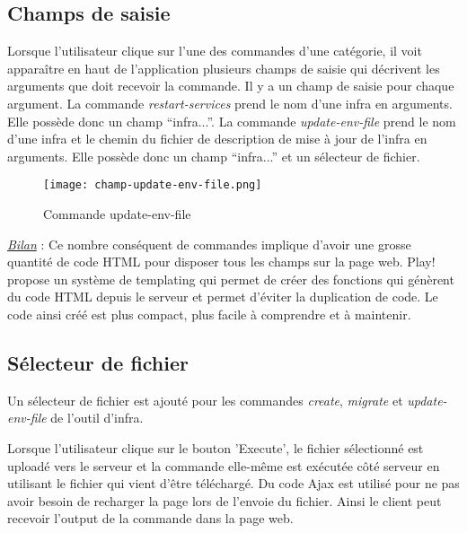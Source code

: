 \subsection{Champs de saisie}


Lorsque l'utilisateur clique sur l'une des commandes d'une catégorie, il voit
apparaître en haut de l'application plusieurs champs de saisie qui décrivent les
arguments que doit recevoir la commande.
Il y a un champ de saisie pour chaque argument.
La commande \textit{restart-services} prend le nom d'une infra en
arguments. Elle possède donc un champ ``infra...''.
La commande \textit{update-env-file} prend le nom d'une infra et le chemin du
fichier de description de mise à jour de l'infra en arguments. Elle possède donc
un champ ``infra...'' et un sélecteur de fichier.

\begin{figure}[H]
  \begin{center}
    \texttt{[image: champ-update-env-file.png]} 
  \end{center}
  \caption{Commande update-env-file} 
\end{figure}

\underline{\textit{Bilan}} : Ce nombre conséquent de commandes implique d'avoir
une grosse quantité de code HTML pour disposer tous les champs sur la
page web. Play! propose un système de templating qui permet de créer des
fonctions qui génèrent du code HTML depuis le serveur et permet d'éviter la
duplication de code. Le code ainsi créé est plus compact, plus facile à
comprendre et à maintenir.

\subsection{Sélecteur de fichier}

Un sélecteur de fichier est ajouté pour les commandes \textit{create},
\textit{migrate} et \textit{update-env-file} de l'outil d'infra.

Lorsque l'utilisateur clique sur le bouton 'Execute', le fichier sélectionné est
uploadé vers le serveur et la commande elle-même est exécutée côté serveur 
en utilisant le fichier qui vient d'être téléchargé.
Du code Ajax est utilisé pour ne pas avoir besoin de recharger la page lors de
l'envoie du fichier.
Ainsi le client peut recevoir l'output de la commande dans la page web.

